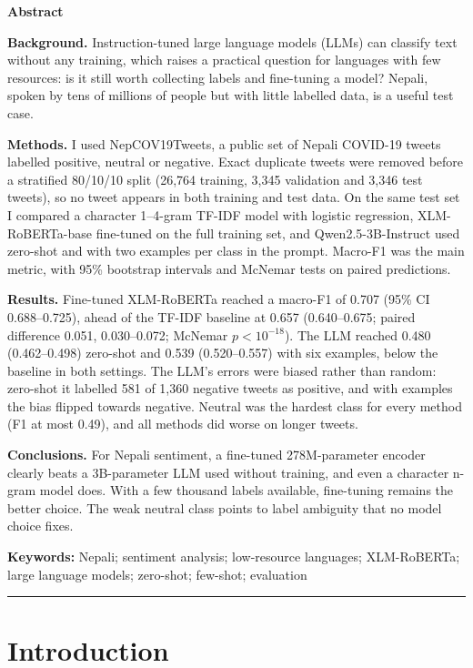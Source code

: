 \documentclass[11pt,a4paper]{article}
\begin{document}
{\small
\textbf{Abstract}

\textbf{Background.} Instruction-tuned large language models (LLMs) can classify text without any training, which raises a practical question for languages with few resources: is it still worth collecting labels and fine-tuning a model? Nepali, spoken by tens of millions of people but with little labelled data, is a useful test case.

\textbf{Methods.} I used NepCOV19Tweets, a public set of Nepali COVID-19 tweets labelled positive, neutral or negative. Exact duplicate tweets were removed before a stratified 80/10/10 split (26,764 training, 3,345 validation and 3,346 test tweets), so no tweet appears in both training and test data. On the same test set I compared a character 1--4-gram TF-IDF model with logistic regression, XLM-RoBERTa-base fine-tuned on the full training set, and Qwen2.5-3B-Instruct used zero-shot and with two examples per class in the prompt. Macro-F1 was the main metric, with 95\% bootstrap intervals and McNemar tests on paired predictions.

\textbf{Results.} Fine-tuned XLM-RoBERTa reached a macro-F1 of 0.707 (95\% CI 0.688--0.725), ahead of the TF-IDF baseline at 0.657 (0.640--0.675; paired difference 0.051, 0.030--0.072; McNemar $p<10^{-18}$). The LLM reached 0.480 (0.462--0.498) zero-shot and 0.539 (0.520--0.557) with six examples, below the baseline in both settings. The LLM's errors were biased rather than random: zero-shot it labelled 581 of 1,360 negative tweets as positive, and with examples the bias flipped towards negative. Neutral was the hardest class for every method (F1 at most 0.49), and all methods did worse on longer tweets.

\textbf{Conclusions.} For Nepali sentiment, a fine-tuned 278M-parameter encoder clearly beats a 3B-parameter LLM used without training, and even a character n-gram model does. With a few thousand labels available, fine-tuning remains the better choice. The weak neutral class points to label ambiguity that no model choice fixes.

\textbf{Keywords:} Nepali; sentiment analysis; low-resource languages; XLM-RoBERTa; large language models; zero-shot; few-shot; evaluation\par
}
\noindent\rule{\textwidth}{0.4pt}

\section{Introduction}
\end{document}
